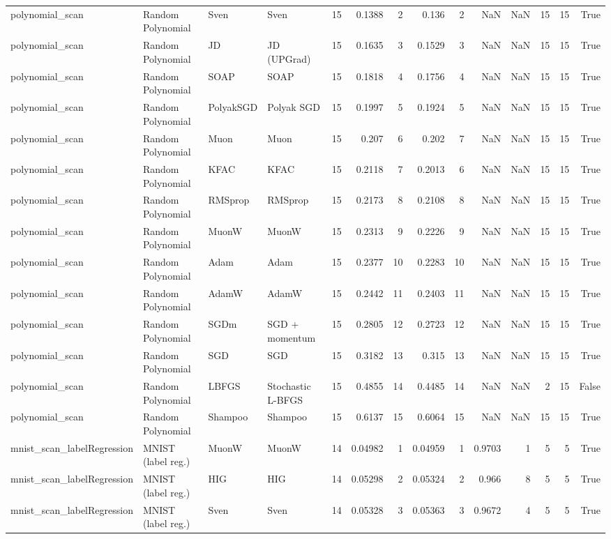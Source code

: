 \begin{tabular}{llllrrrrrrrrrr}
polynomial\_scan & Random Polynomial & Sven & Sven & 15 & 0.1388 & 2 & 0.136 & 2 & NaN & NaN & 15 & 15 & True \\
polynomial\_scan & Random Polynomial & JD & JD (UPGrad) & 15 & 0.1635 & 3 & 0.1529 & 3 & NaN & NaN & 15 & 15 & True \\
polynomial\_scan & Random Polynomial & SOAP & SOAP & 15 & 0.1818 & 4 & 0.1756 & 4 & NaN & NaN & 15 & 15 & True \\
polynomial\_scan & Random Polynomial & PolyakSGD & Polyak SGD & 15 & 0.1997 & 5 & 0.1924 & 5 & NaN & NaN & 15 & 15 & True \\
polynomial\_scan & Random Polynomial & Muon & Muon & 15 & 0.207 & 6 & 0.202 & 7 & NaN & NaN & 15 & 15 & True \\
polynomial\_scan & Random Polynomial & KFAC & KFAC & 15 & 0.2118 & 7 & 0.2013 & 6 & NaN & NaN & 15 & 15 & True \\
polynomial\_scan & Random Polynomial & RMSprop & RMSprop & 15 & 0.2173 & 8 & 0.2108 & 8 & NaN & NaN & 15 & 15 & True \\
polynomial\_scan & Random Polynomial & MuonW & MuonW & 15 & 0.2313 & 9 & 0.2226 & 9 & NaN & NaN & 15 & 15 & True \\
polynomial\_scan & Random Polynomial & Adam & Adam & 15 & 0.2377 & 10 & 0.2283 & 10 & NaN & NaN & 15 & 15 & True \\
polynomial\_scan & Random Polynomial & AdamW & AdamW & 15 & 0.2442 & 11 & 0.2403 & 11 & NaN & NaN & 15 & 15 & True \\
polynomial\_scan & Random Polynomial & SGDm & SGD + momentum & 15 & 0.2805 & 12 & 0.2723 & 12 & NaN & NaN & 15 & 15 & True \\
polynomial\_scan & Random Polynomial & SGD & SGD & 15 & 0.3182 & 13 & 0.315 & 13 & NaN & NaN & 15 & 15 & True \\
polynomial\_scan & Random Polynomial & LBFGS & Stochastic L-BFGS & 15 & 0.4855 & 14 & 0.4485 & 14 & NaN & NaN & 2 & 15 & False \\
polynomial\_scan & Random Polynomial & Shampoo & Shampoo & 15 & 0.6137 & 15 & 0.6064 & 15 & NaN & NaN & 15 & 15 & True \\
mnist\_scan\_labelRegression & MNIST (label reg.) & MuonW & MuonW & 14 & 0.04982 & 1 & 0.04959 & 1 & 0.9703 & 1 & 5 & 5 & True \\
mnist\_scan\_labelRegression & MNIST (label reg.) & HIG & HIG & 14 & 0.05298 & 2 & 0.05324 & 2 & 0.966 & 8 & 5 & 5 & True \\
mnist\_scan\_labelRegression & MNIST (label reg.) & Sven & Sven & 14 & 0.05328 & 3 & 0.05363 & 3 & 0.9672 & 4 & 5 & 5 & True \\

\end{tabular}

